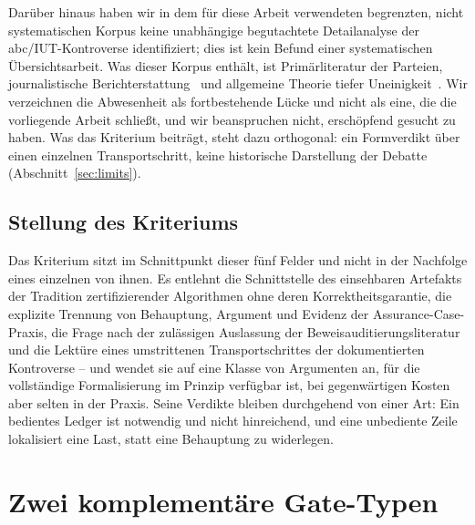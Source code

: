 \documentclass[11pt,a4paper]{article}
\begin{document}
Darüber hinaus haben wir in dem für diese Arbeit verwendeten begrenzten,
nicht systematischen Korpus keine unabhängige begutachtete Detailanalyse der
abc/IUT-Kontroverse identifiziert; dies ist kein Befund einer systematischen
Übersichtsarbeit. Was dieser Korpus enthält, ist Primärliteratur der
Parteien, journalistische Berichterstattung~\cite{Castelvecchi2020} und
allgemeine Theorie tiefer Uneinigkeit~\cite{Aberdein2023}. Wir verzeichnen
die Abwesenheit als fortbestehende Lücke und nicht als eine, die die
vorliegende Arbeit schließt, und wir beanspruchen nicht, erschöpfend gesucht
zu haben. Was das Kriterium beiträgt, steht dazu orthogonal: ein Formverdikt
über einen einzelnen Transportschritt, keine historische Darstellung der
Debatte (Abschnitt~\ref{sec:limits}).

\subsection{Stellung des Kriteriums}\label{sec:related-position}

Das Kriterium sitzt im Schnittpunkt dieser fünf Felder und nicht in der
Nachfolge eines einzelnen von ihnen. Es entlehnt die Schnittstelle des
einsehbaren Artefakts der Tradition zertifizierender Algorithmen ohne deren
Korrektheitsgarantie, die explizite Trennung von Behauptung, Argument und
Evidenz der Assurance-Case-Praxis, die Frage nach der zulässigen Auslassung
der Beweisauditierungsliteratur und die Lektüre eines umstrittenen
Transportschrittes der dokumentierten Kontroverse -- und wendet sie auf eine
Klasse von Argumenten an, für die vollständige Formalisierung im Prinzip
verfügbar ist, bei gegenwärtigen Kosten aber selten in der Praxis. Seine
Verdikte bleiben durchgehend von einer Art: Ein bedientes Ledger ist notwendig
und nicht hinreichend, und eine unbediente Zeile lokalisiert eine Last, statt
eine Behauptung zu widerlegen.


\section{Zwei komplementäre Gate-Typen}\label{sec:gates}
\end{document}
